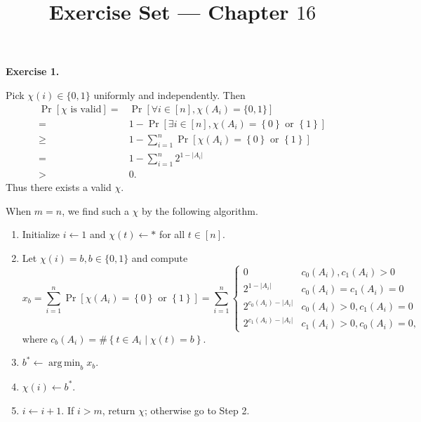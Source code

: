 \documentclass[a4paper]{article}
\title{Exercise Set --- Chapter $16$}
\date{}
\newenvironment{exercise}[1]{
	\par
	\noindent\textbf{Exercise #1.}\quad
}{
	\par
	\bigskip
}
\DeclareMathOperator*{\argmin}{\arg\,\min}
\newcommand{\cbra}[1]{\left\{ #1 \right\}}
\newcommand{\sbra}[1]{\left[ #1 \right]}
\newcommand{\bin}{\{0,1\}}
\begin{document}
\maketitle

\begin{exercise}{1}
    Pick $\chi(i)\in\bin$ uniformly and independently. Then
    \begin{align*}
        \Pr\sbra{\chi\text{ is valid}}
        =&\Pr\sbra{\forall i\in[n],\chi(A_i)=\bin}\\
        =&1-\Pr\sbra{\exists i\in[n],\chi(A_i)=\cbra{0}\text{ or }\cbra{1}}\\
        \geq&1-\sum_{i=1}^n\Pr\sbra{\chi(A_i)=\cbra{0}\text{ or }\cbra{1}}\\
        =&1-\sum_{i=1}^n2^{1-|A_i|}\\
        >&0.
    \end{align*}
    Thus there exists a valid $\chi$.

    When $m=n$, we find such a $\chi$ by the following algorithm.
    \begin{enumerate}
        \item Initialize $i\gets1$ and $\chi(t)\gets*$ for all $t\in[n]$.
        \item Let $\chi(i)=b,b\in\bin$ and compute 
            $$
            x_b=\sum_{i=1}^n\Pr\sbra{\chi(A_i)=\cbra{0}\text{ or }\cbra{1}}
            =\sum_{i=1}^n\begin{cases}
                0 & c_0(A_i),c_1(A_i)>0\\
                2^{1-|A_i|} & c_0(A_i)=c_1(A_i)=0\\
                2^{c_0(A_i)-|A_i|} & c_0(A_i)>0,c_1(A_i)=0\\
                2^{c_1(A_i)-|A_i|} & c_1(A_i)>0,c_0(A_i)=0,
            \end{cases}
            $$
            where $c_b(A_i)=\#\cbra{t\in A_i\middle|\chi(t)=b}$.
        \item $b^*\gets\argmin_bx_b$.
        \item $\chi(i)\gets b^*$.
        \item $i\gets i+1$. If $i>m$, return $\chi$; otherwise go to Step 2.
    \end{enumerate}
\end{exercise}
\end{document}
